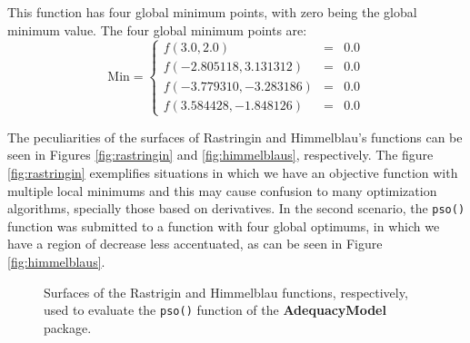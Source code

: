 \documentclass[10pt,letterpaper]{article}
\begin{document}
This function has four global minimum points, with zero being the global minimum value. The four global minimum points are:
$$
\mathrm{Min} = \left \{
\begin{array}{rcc}
f(3.0, 2.0) & = & 0.0 \\
f(-2.805118, 3.131312) & = & 0.0 \\
f(-3.779310, -3.283186) & = & 0.0 \\
f(3.584428, -1.848126) & = & 0.0
\end{array} 
\right.
$$

The peculiarities of the surfaces of Rastringin and Himmelblau's functions can be seen in Figures \ref{fig:rastringin} and \ref{fig:himmelblaus}, respectively. The figure \ref{fig:rastringin} exemplifies situations in which we have an objective function with multiple local minimums and this may cause confusion to many optimization algorithms, specially those based on derivatives. In the second scenario, the \texttt{pso()} function was submitted to a function with four global optimums, in which we have a region of decrease less accentuated, as can be seen in Figure \ref{fig:himmelblaus}.
\begin{figure}[H]
	\centering
	
	\caption{Surfaces of the Rastrigin and Himmelblau functions, respectively, used to evaluate the \texttt{pso()} function of the \textbf{AdequacyModel} package.}
\end{figure}
\end{document}
